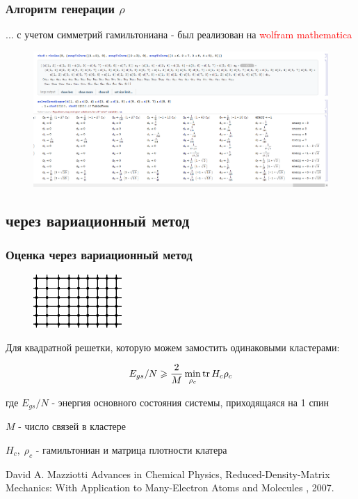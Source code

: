 \documentclass{beamer}
\begin{document}
\begin{frame}
\frametitle{Алгоритм генерации $\rho$}
... с учетом симметрий гамильтониана - был реализован на \textcolor{red}{wolfram mathematica}
\begin{figure}
\includegraphics[width=1\linewidth]{result.png}
\end{figure}

\end{frame}

\subsection{через вариационный метод}
\begin{frame}
\frametitle{Оценка через вариационный метод}
\begin{figure}
\includegraphics[width=0.3\textwidth]{lattice.png}
\end{figure}

Для квадратной решетки, которую можем замостить одинаковыми кластерами:
\vspace{1em}

$$E_{gs}/N \geqslant \frac{2}{M}\min_{\rho_c}\mathrm{tr} \,H_c\rho_c$$

\vspace{1em}
где $E_{gs}/N$ - энергия основного состояния системы, приходящаяся на 1 спин

$M$ - число связей в кластере

$H_c,\;\rho_c$ - гамильтониан и матрица плотности клатера 

\footnotesize{
\begin{thebibliography}{99}
David A. Mazziotti
\newblock Advances in Chemical Physics, Reduced-Density-Matrix Mechanics: With Application to Many-Electron Atoms and Molecules
, 2007.
\end{thebibliography}
}

\end{frame}
\end{document}
